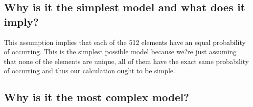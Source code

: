 \documentclass[a4paper, 9pt]{article}
\begin{document}
\subsection*{Why is it the simplest model and what does it imply?}
This assumption implies that each of the 512 elements have an equal probability of occurring.
This is the simplest possible model because we?re just assuming that none of the elements are unique, all of them have the exact same probability of occurring and thus our calculation ought to be simple.
\subsection*{Why is it the most complex model?}
\end{document}
